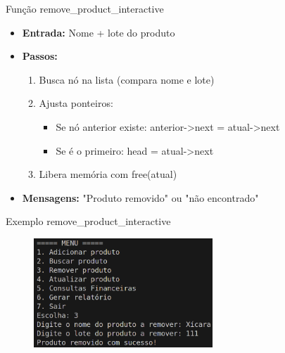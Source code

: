\documentclass{beamer}
\begin{document}
\begin{frame}{Função remove\_product\_interactive}
    \begin{itemize}
        \item \textbf{Entrada:} Nome + lote do produto
        \item \textbf{Passos:}
        \begin{enumerate}
            \item Busca nó na lista (compara nome e lote)
            \item Ajusta ponteiros:
            \begin{itemize}
                \item Se nó anterior existe: anterior-\textgreater next = atual-\textgreater next
                \item Se é o primeiro: head = atual-\textgreater next
            \end{itemize}
            \item Libera memória com free(atual)
        \end{enumerate}
        \item \textbf{Mensagens:} "Produto removido" ou "não encontrado"
    \end{itemize}
\end{frame}

\begin{frame}{Exemplo remove\_product\_interactive}
    \begin{figure}
        \centering
        \includegraphics[width=0.6\textwidth]{img/remover.png}
    \end{figure}
\end{frame}
\end{document}
